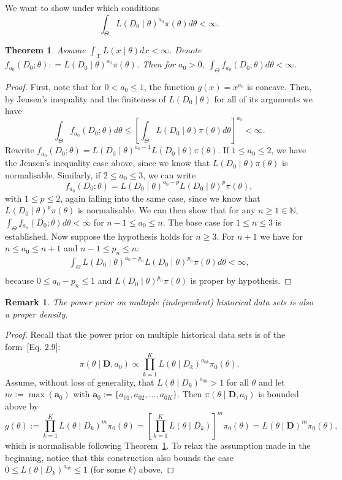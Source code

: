 \documentclass[a4paper, notitlepage, 11pt]{article}
\newtheorem{theorem}{Theorem}[]
\newtheorem{remark}{Remark}[]
\begin{document}
We want to show under which conditions
\[\int_{\Theta} L( D_0 \mid \theta)^{a_0}\pi(\theta) d\theta <\infty.\]
\begin{theorem}
\label{thm:integrability}
 Assume $\int_{\mathcal{X}} L( x \mid \theta)dx < \infty$.
 Denote $f_{a_0}(D_0;\theta) : = L( D_0 \mid \theta)^{a_0}\pi(\theta)$.
 Then for $a_0 > 0$, $\int_{\Theta} f_{a_0}(D_0;\theta) d\theta <\infty$.
\end{theorem}
\begin{proof}
First, note that for $0 < a_0 \leq 1$, the function $g(x) = x^{a_0}$ is concave.
Then, by Jensen's inequality and the finiteness of $L( D_0 \mid \theta)$ for all of its arguments we have
\[ \int_{\Theta} f_{a_0}(D_0; \theta) d\theta \leq \left[ \int_{\Theta} L(D_0 \mid\theta)\pi(\theta)d\theta \right]^{a_0} < \infty. \]
Rewrite $f_{a_0}(D_0; \theta) = L(D_0\mid\theta)^{a_0 -1} L(D_0\mid\theta)\pi(\theta)$.
If $1 \leq a_0 \leq 2$, we have the Jensen's inequality case above, since we know that $L(D_0\mid\theta)\pi(\theta)$ is normalisable.
Similarly, if $2 \leq a_0 \leq 3$, we can write 
\[  f_{a_0}(D_0; \theta) = L(D_0\mid\theta)^{a_0-p} L(D_0\mid\theta)^p\pi(\theta), \]
with $1 \leq p \leq 2$, again falling into the same case, since we know that $L(D_0\mid\theta)^{p}\pi(\theta)$ is normalisable.
We can then show that for any $n \geq 1 \in \mathbb{N}$, $\int_{\Theta}f_{a_0}( D_0 ; \theta)d\theta < \infty$ for  $n-1 \leq a_0 \leq n$.
The base case for $1 \leq n \leq 3$ is established.
Now suppose the hypothesis holds for $n \geq 3$.
For $n + 1$ we have for $ n \leq  a_0 \leq n + 1$ and $n-1 \leq p_n \leq n$:
\begin{align*}
 \int_{\Theta} L(D_0\mid\theta)^{a_0-p_n} L(D_0\mid\theta)^{p_n}\pi(\theta)d\theta < \infty, \\
\end{align*}
because $0 \leq a_0 - p_n \leq 1$ and $L(D_0\mid\theta)^{p_n}\pi(\theta)$ is proper by hypothesis.
\end{proof}
\begin{remark}
 The power prior on multiple (independent) historical data sets is also a proper density.
\end{remark}
\begin{proof}
 Recall that the power prior on multiple historical data sets is of the form~[Eq. 2.9]\citep{Ibrahim2015}:
 \[ \pi(\theta \mid \boldsymbol D, a_0) \propto \prod_{k=1}^K L(\theta \mid D_k)^{a_{0k}} \pi_0(\theta). \]
Assume, without loss of generality, that $L(\theta \mid  D_k)^{a_{0k}} > 1$ for all $\theta$ and let $m := \max(\boldsymbol a_0)$ with $\boldsymbol a_0 := \{ a_{01}, a_{02}, \ldots, a_{0K}\}$.
Then $\pi(\theta \mid \boldsymbol D, a_0)$ is bounded above by 
\[  g(\theta) :=  \prod_{k=1}^K L(\theta \mid D_k)^{m} \pi_0(\theta) =  \left[ \prod_{k=1}^K L(\theta \mid D_k) \right]^m  \pi_0(\theta) = L(\theta \mid \boldsymbol D)^m \pi_0(\theta), \]
which is normalisable following Theorem~\ref{thm:integrability}.
To relax the assumption made in the beginning, notice that this construction also bounds the case $ 0 \leq  L(\theta \mid  D_k)^{a_{0k}} \leq 1$ (for some $k$) above.
\end{proof}
\end{document}
